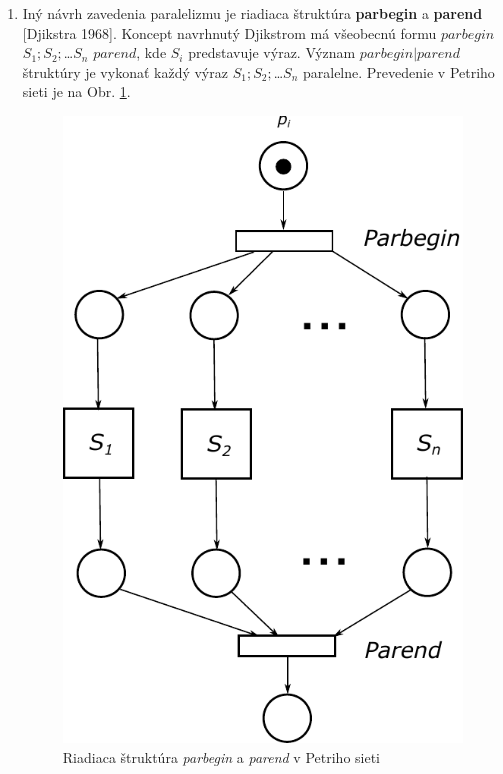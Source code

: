 \begin{enumerate}
	\item Iný návrh zavedenia paralelizmu je riadiaca štruktúra \textbf{parbegin} a \textbf{parend} [Djikstra 1968]. Koncept navrhnutý Djikstrom má všeobecnú formu $parbegin$ $S_1; S_2;$\dots$S_n$ $parend$, kde $S_i$ predstavuje výraz. Význam $parbegin | parend$ štruktúry je vykonať každý výraz $S_1; S_2;$\dots$S_n$ paralelne. Prevedenie v Petriho sieti je na Obr. \ref{fig:parbegin}.
	
	\begin{figure}[H]
		\centering
		\includegraphics[scale=0.5]{obrazky-figures/PN-parbegin}
		\caption{Riadiaca štruktúra \emph{parbegin} a \emph{parend} v Petriho sieti}
		\label{fig:parbegin}
	\end{figure}
	
	
\end{enumerate} 

